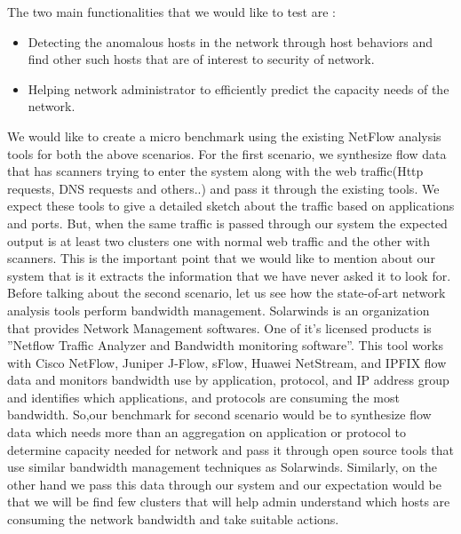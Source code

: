 The two main functionalities that we would like to test are :
\begin{itemize}
	
	\item Detecting the anomalous hosts in the network through host behaviors and find other
	such hosts that are of interest to security of network.
	
	\item Helping network administrator to efficiently predict the capacity needs of the network.
\end{itemize}

We would like to create a micro benchmark using the existing NetFlow analysis tools
for both the above scenarios. For the first scenario, we synthesize flow data that has
scanners trying to enter the system along with the web traffic(Http requests, DNS requests
and others..) and pass it through the existing tools. We expect these tools to give a detailed
sketch about the traffic based on applications and ports. But, when the same traffic is
passed through our system the expected output is at least two clusters one with normal
web traffic and the other with scanners. This is the important point that we would like to
mention about our system that is it extracts the information that we have never asked it to
look for.
Before talking about the second scenario, let us see how the state-of-art network analysis
tools perform bandwidth management. Solarwinds is an organization that provides
Network Management softwares. One of it’s licensed products is ”Netflow Traffic Analyzer
and Bandwidth monitoring software”. This tool works with Cisco NetFlow, Juniper
J-Flow, sFlow, Huawei NetStream, and IPFIX flow data and monitors bandwidth use by
application, protocol, and IP address group and identifies which applications, and protocols
are consuming the most bandwidth. So,our benchmark for second scenario would be
to synthesize flow data which needs more than an aggregation on application or protocol
to determine capacity needed for network and pass it through open source tools that use
similar bandwidth management techniques as Solarwinds. Similarly, on the other hand
we pass this data through our system and our expectation would be that we will be find
few clusters that will help admin understand which hosts are consuming the network
bandwidth and take suitable actions.